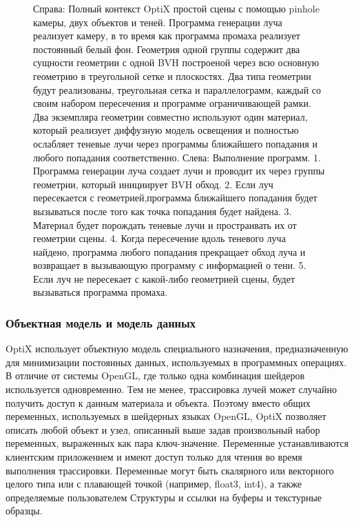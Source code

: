 \begin{figure}[h!]
\caption{Справа: Полный контекст OptiX простой сцены с помощью pinhole камеры, двух объектов и теней.
Программа генерации луча реализует камеру, в то время как программа промаха реализует постоянный белый фон.
Геометрия одной группы содержит два сущности геометрии с одной BVH построеной через всю основную геометрию в треугольной сетке и плоскостях.
Два типа геометрии будут реализованы, треугольная сетка и параллелограмм, каждый со своим набором пересечения и программе ограничивающей рамки.
Два экземпляра геометрии совместно используют один материал, который реализует диффузную модель освещения и полностью ослабляет теневые лучи через программы ближайшего попадания и любого попадания соответственно.
Слева: Выполнение программ. 1. Программа генерации луча создает лучи и проводит их через группы геометрии, который инициирует BVH обход.
2. Если луч пересекается с геометрией,программа ближайшего попадания будет вызываться после того как точка попадания будет найдена.
3. Материал будет порождать теневые лучи и простраивать их от геометрии сцены.
4. Когда пересечение вдоль теневого луча найдено, программа любого попадания прекращает обход луча и возвращает в вызывающую программу с информацией о тени.
5. Если луч не пересекает с какой-либо геометрией сцены, будет вызываться программа промаха.}
\label{fig1}
\end{figure}

\subsubsection {Объектная модель и модель данных}
OptiX использует объектную модель специального назначения, предназначенную для минимизации постоянных данных, используемых в программных операциях.
В отличие от системы OpenGL, где только одна комбинация шейдеров используется одновременно.
Тем не менее, трассировка лучей может случайно получить доступ к данным материала и объекта. Поэтому вместо общих переменных, используемых в шейдерных языках OpenGL, OptiX позволяет описать любой объект и узел, описанный выше задав произвольный набор переменных, выраженных как пара ключ-значение.
Переменные устанавливаются клиентским приложением и имеют доступ только для чтения во время выполнения трассировки.
Переменные могут быть скалярного или векторного целого типа или с плавающей точкой (например, float3, int4), а также определяемые пользователем Структуры и ссылки на буферы и текстурные образцы.

